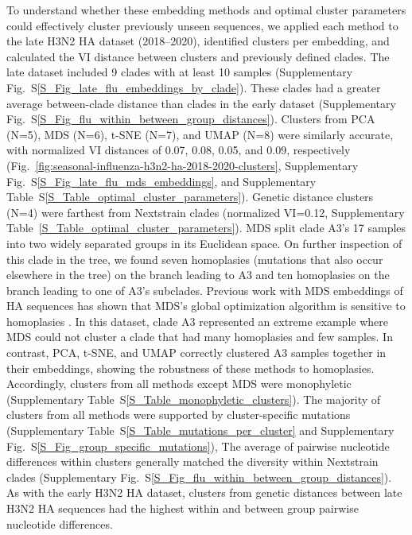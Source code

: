 \documentclass[webpdf,contemporary,large,single]{oup-authoring-template}%
\theoremstyle{thmstyleone}%
\theoremstyle{thmstyletwo}%
\theoremstyle{thmstylethree}%
\begin{document}
To understand whether these embedding methods and optimal cluster parameters could effectively cluster previously unseen sequences, we applied each method to the late H3N2 HA dataset (2018--2020), identified clusters per embedding, and calculated the VI distance between clusters and previously defined clades.
The late dataset included 9 clades with at least 10 samples (Supplementary Fig.~S\ref{S_Fig_late_flu_embeddings_by_clade}).
These clades had a greater average between-clade distance than clades in the early dataset (Supplementary Fig.~S\ref{S_Fig_flu_within_between_group_distances}).
Clusters from PCA (N=5), MDS (N=6), t-SNE (N=7), and UMAP (N=8) were similarly accurate, with normalized VI distances of 0.07, 0.08, 0.05, and 0.09, respectively (Fig.~\ref{fig:seasonal-influenza-h3n2-ha-2018-2020-clusters}, Supplementary Fig.~S\ref{S_Fig_late_flu_mds_embeddings}, and Supplementary Table~S\ref{S_Table_optimal_cluster_parameters}).
Genetic distance clusters (N=4) were farthest from Nextstrain clades (normalized VI=0.12, Supplementary Table~\ref{S_Table_optimal_cluster_parameters}).
MDS split clade A3's 17 samples into two widely separated groups in its Euclidean space.
On further inspection of this clade in the tree, we found seven homoplasies (mutations that also occur elsewhere in the tree) on the branch leading to A3 and ten homoplasies on the branch leading to one of A3's subclades.
Previous work with MDS embeddings of HA sequences has shown that MDS's global optimization algorithm is sensitive to homoplasies \citep{Ito2011}.
In this dataset, clade A3 represented an extreme example where MDS could not cluster a clade that had many homoplasies and few samples.
In contrast, PCA, t-SNE, and UMAP correctly clustered A3 samples together in their embeddings, showing the robustness of these methods to homoplasies.
Accordingly, clusters from all methods except MDS were monophyletic (Supplementary Table~S\ref{S_Table_monophyletic_clusters}).
The majority of clusters from all methods were supported by cluster-specific mutations (Supplementary Table~S\ref{S_Table_mutations_per_cluster} and Supplementary Fig.~S\ref{S_Fig_group_specific_mutations}),
The average of pairwise nucleotide differences within clusters generally matched the diversity within Nextstrain clades (Supplementary Fig.~S\ref{S_Fig_flu_within_between_group_distances}).
As with the early H3N2 HA dataset, clusters from genetic distances between late H3N2 HA sequences had the highest within and between group pairwise nucleotide differences.
\end{document}
